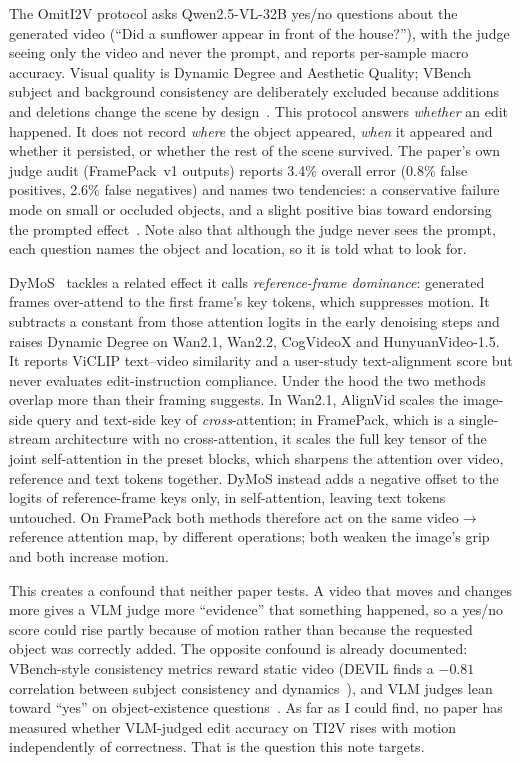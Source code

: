 \documentclass[10pt,a4paper]{article}
\begin{document}
The OmitI2V protocol asks Qwen2.5-VL-32B yes/no questions about the generated video (``Did a sunflower appear in front of the house?''), with the judge seeing only the video and never the prompt, and reports per-sample macro accuracy. Visual quality is Dynamic Degree and Aesthetic Quality; VBench subject and background consistency are deliberately excluded because additions and deletions change the scene by design~\cite{alignvid}. This protocol answers \emph{whether} an edit happened. It does not record \emph{where} the object appeared, \emph{when} it appeared and whether it persisted, or whether the rest of the scene survived. The paper's own judge audit (FramePack~v1 outputs) reports 3.4\% overall error (0.8\% false positives, 2.6\% false negatives) and names two tendencies: a conservative failure mode on small or occluded objects, and a slight positive bias toward endorsing the prompted effect~\cite{alignvid}. Note also that although the judge never sees the prompt, each question names the object and location, so it is told what to look for.

DyMoS~\cite{dymos} tackles a related effect it calls \emph{reference-frame dominance}: generated frames over-attend to the first frame's key tokens, which suppresses motion. It subtracts a constant from those attention logits in the early denoising steps and raises Dynamic Degree on Wan2.1, Wan2.2, CogVideoX and HunyuanVideo-1.5. It reports ViCLIP text--video similarity and a user-study text-alignment score but never evaluates edit-instruction compliance. Under the hood the two methods overlap more than their framing suggests. In Wan2.1, AlignVid scales the image-side query and text-side key of \emph{cross}-attention; in FramePack, which is a single-stream architecture with no cross-attention, it scales the full key tensor of the joint self-attention in the preset blocks, which sharpens the attention over video, reference and text tokens together. DyMoS instead adds a negative offset to the logits of reference-frame keys only, in self-attention, leaving text tokens untouched. On FramePack both methods therefore act on the same video$\to$reference attention map, by different operations; both weaken the image's grip and both increase motion.

This creates a confound that neither paper tests. A video that moves and changes more gives a VLM judge more ``evidence'' that something happened, so a yes/no score could rise partly because of motion rather than because the requested object was correctly added. The opposite confound is already documented: VBench-style consistency metrics reward static video (DEVIL finds a $-0.81$ correlation between subject consistency and dynamics~\cite{devil}), and VLM judges lean toward ``yes'' on object-existence questions~\cite{pope}. As far as I could find, no paper has measured whether VLM-judged edit accuracy on TI2V rises with motion independently of correctness. That is the question this note targets.
\end{document}
